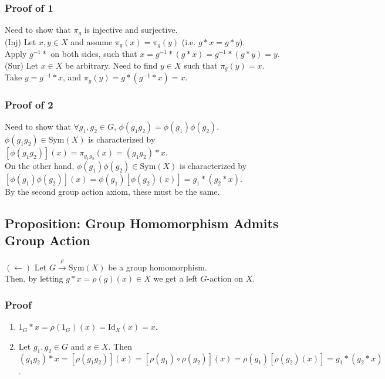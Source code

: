 \documentclass[11pt]{article}
\newcommand{\0}{\emptyset}
\begin{document}
\subsubsection*{Proof of 1}
\label{sec:org3132bd6}
Need to show that \(\pi_{g}\) is injective and surjective.\\[0pt]
(Inj) Let \(x,y\in X\) and assume \(\pi_{g}(x)=\pi_{g}(y)\) (i.e. \(g*x=g*y\)).\\[0pt]
Apply \(g^{-1}*\) on both sides, such that \(x=g^{-1}*(g*x)=g^{-1}*(g*y)=y\).\\[0pt]
(Sur) Let \(x\in X\) be arbitrary. Need to find \(y\in X\) such that \(\pi_{g}(y)=x\).\\[0pt]
Take \(y=g^{-1}*x\), and \(\pi_{g}(y)=g*(g^{-1}*x)=x\).\\[0pt]
\subsubsection*{Proof of 2}
\label{sec:org6f35941}
Need to show that \(\forall g_{1},g_{2}\in G\), \(\phi(g_{1}g_{2})=\phi(g_{1})\phi(g_{2})\).\\[0pt]
\(\phi(g_{1}g_{2})\in\text{Sym}(X)\) is characterized by \([\phi(g_{1}g_{2})](x)=\pi_{g_{1}g_{2}}(x)=(g_{1}g_{2})*x\).\\[0pt]
On the other hand, \(\phi(g_{1})\phi(g_{2})\in\text{Sym}(X)\) is characterized by \([\phi(g_{1})\phi(g_{2})](x)=\phi(g_{1})[\phi(g_{2})(x)]=g_{1}*(g_{2}*x)\).\\[0pt]
By the second group action axiom, these must be the same.\\[0pt]
\subsection*{Proposition: Group Homomorphism Admits Group Action}
\label{sec:org530452d}
\((\longleftarrow)\) Let \(G\overset{\rho}{\to}\text{Sym}(X)\) be a group homomorphism.\\[0pt]
Then, by letting \(g*x=\rho(g)(x)\in X\) we get a left \(G\)-action on \(X\).\\[0pt]
\subsubsection*{Proof}
\label{sec:org74bb75f}
\begin{enumerate}
\item \(1_{G}*x=\rho(1_{G})(x)=\text{Id}_{X}(x)=x\).\\[0pt]
\item Let \(g_{1},g_{2}\in G\) and \(x\in X\). Then \((g_{1}g_{2})*x=[\rho(g_{1}g_{2})](x)=[\rho(g_{1})\circ\rho(g_{2})](x)=\rho(g_{1})[\rho(g_{2})(x)]=g_{1}*(g_{2}*x)\).\\[0pt]
\end{enumerate}
\end{document}
